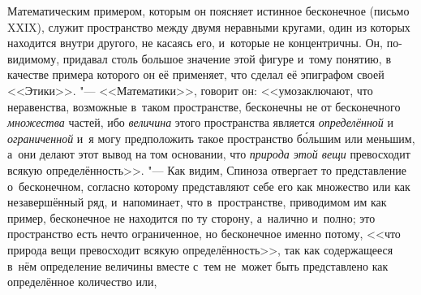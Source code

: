 Математическим примером, которым он поясняет истинное бесконечное (письмо
XXIX), служит пространство между двумя неравными кругами, один из которых
находится внутри другого, не касаясь его, и~которые не концентричны. Он,
по-видимому, придавал столь большое значение этой фигуре и~тому понятию,
в качестве примера которого он её
применяет, что сделал её эпиграфом своей <<Этики>>. "--- <<Математики>>, говорит он: <<умозаключают, что
неравенства, возможные в~таком пространстве, бесконечны не от бесконечного
{\em множества} частей, ибо {\em величина} этого пространства является
{\em определённой} и {\em ограниченной} и~я могу предположить такое
пространство б\'{о}льшим или меньшим, а~они делают этот вывод на том основании,
что {\em природа этой вещи} превосходит всякую
определённость>>. "--- Как
видим, Спиноза отвергает то представление о~бесконечном, согласно которому
представляют себе его как множество или как незавершённый ряд, и~напоминает,
что в~пространстве, приводимом им как пример, бесконечное не находится по ту
сторону, а~налично и~полно; это пространство есть нечто ограниченное, но
бесконечное именно потому, <<что природа вещи превосходит всякую
определённость>>, так как содержащееся в~нём определение величины вместе с~тем
не~может быть представлено как определённое количество или,
